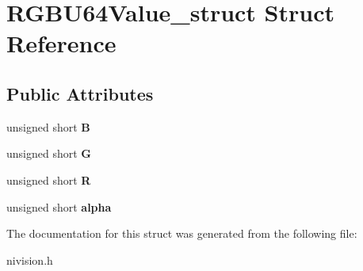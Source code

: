 \hypertarget{structRGBU64Value__struct}{\section{\-R\-G\-B\-U64\-Value\-\_\-struct \-Struct \-Reference}
\label{structRGBU64Value__struct}
}
\subsection*{\-Public \-Attributes}
\begin{DoxyCompactItemize}
\item 
\hypertarget{structRGBU64Value__struct_afd5efbf1d815f520aba6560ca0567c73}{unsigned short {\bfseries \-B}}\label{structRGBU64Value__struct_afd5efbf1d815f520aba6560ca0567c73}

\item 
\hypertarget{structRGBU64Value__struct_a81030d0b0c318f8f306da68f2ac2d653}{unsigned short {\bfseries \-G}}\label{structRGBU64Value__struct_a81030d0b0c318f8f306da68f2ac2d653}

\item 
\hypertarget{structRGBU64Value__struct_a044393f692dace720592b01f91c3a668}{unsigned short {\bfseries \-R}}\label{structRGBU64Value__struct_a044393f692dace720592b01f91c3a668}

\item 
\hypertarget{structRGBU64Value__struct_aaf4921d6a030573712730e5d83ceb3d6}{unsigned short {\bfseries alpha}}\label{structRGBU64Value__struct_aaf4921d6a030573712730e5d83ceb3d6}

\end{DoxyCompactItemize}


\-The documentation for this struct was generated from the following file\-:\begin{DoxyCompactItemize}
\item 
nivision.\-h\end{DoxyCompactItemize}
